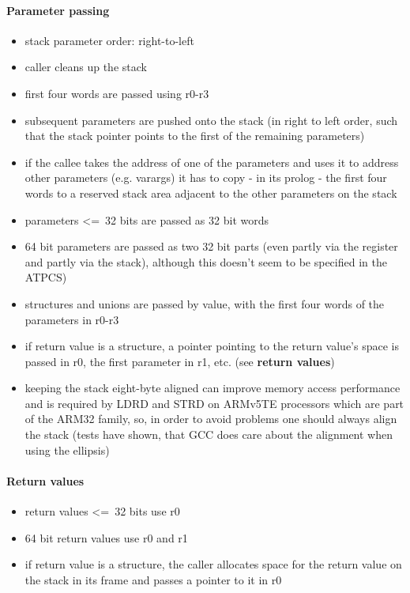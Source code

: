 \paragraph{Parameter passing}

\begin{itemize}
\item stack parameter order: right-to-left
\item caller cleans up the stack
\item first four words are passed using r0-r3
\item subsequent parameters are pushed onto the stack (in right to left order, such that the stack pointer points to the first of the remaining parameters)
\item if the callee takes the address of one of the parameters and uses it to address other parameters (e.g. varargs) it has to copy - in its prolog - the first four words to a reserved stack area adjacent to the other parameters on the stack
\item parameters \textless=\ 32 bits are passed as 32 bit words
\item 64 bit parameters are passed as two 32 bit parts (even partly via the register and partly via the stack), although this doesn't seem to be specified in the ATPCS)
\item structures and unions are passed by value, with the first four words of the parameters in r0-r3
\item if return value is a structure, a pointer pointing to the return value's space is passed in r0, the first parameter in r1, etc. (see {\bf return values})
\item keeping the stack eight-byte aligned can improve memory access performance and is required by LDRD and STRD on ARMv5TE processors which are part of the ARM32 family, so, in order to avoid problems one should always align the stack (tests have shown, that GCC does care about the alignment when using the ellipsis)
\end{itemize}

\paragraph{Return values}
\begin{itemize}
\item return values \textless=\ 32 bits use r0
\item 64 bit return values use r0 and r1
\item if return value is a structure, the caller allocates space for the return value on the stack in its frame and passes a pointer to it in r0
\end{itemize}

